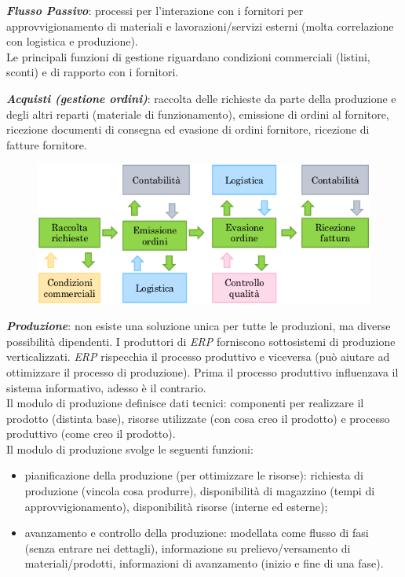\documentclass[a4paper, notitlepage, 9pt]{extreport}
\begin{document}
\noindent
\textit{\textbf{Flusso Passivo}}: processi per l’interazione con i fornitori per approvvigionamento di materiali e lavorazioni/servizi esterni (molta correlazione con logistica e produzione).\\
Le principali funzioni di gestione riguardano condizioni commerciali (listini, sconti) e di rapporto con i fornitori.
\newline

\noindent
\textit{\textbf{Acquisti (gestione ordini)}}: raccolta delle richieste da parte della produzione e degli altri reparti (materiale di funzionamento), emissione di ordini al fornitore, ricezione documenti di consegna ed evasione di ordini fornitore, ricezione di fatture fornitore.
\begin{figure}[H]
	\centering
	\includegraphics[scale=0.3]{Acquisti}
\end{figure}

\noindent
\textit{\textbf{Produzione}}: non esiste una soluzione unica per tutte le produzioni, ma diverse possibilità dipendenti. I produttori di \textit{ERP} forniscono sottosistemi di produzione verticalizzati. \textit{ERP} rispecchia il processo produttivo e viceversa (può aiutare ad ottimizzare il processo di produzione). Prima il processo produttivo influenzava il sistema informativo, adesso è il contrario.\\
Il modulo di produzione definisce dati tecnici: componenti per realizzare il prodotto (distinta base), risorse utilizzate (con cosa creo il prodotto) e processo produttivo (come creo il prodotto).\\
Il modulo di produzione svolge le seguenti funzioni:
\begin{itemize}
	\item pianificazione della produzione (per ottimizzare le risorse): richiesta di produzione (vincola cosa produrre), disponibilità di magazzino (tempi di approvvigionamento), disponibilità risorse (interne ed esterne);
	\item avanzamento e controllo della produzione: modellata come flusso di fasi (senza entrare nei dettagli), informazione su prelievo/versamento di materiali/prodotti, informazioni di avanzamento (inizio e fine di una fase).
\end{itemize}
\end{document}
